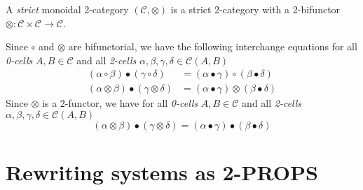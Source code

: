 \documentclass[a4paper]{article}
\begin{document}
\begin{definition}\label{def:monoidal-two-cat}
  A \emph{strict} monoidal 2-category $(\mathcal{C}, \otimes)$ is a strict
    2-category with a 2-bifunctor $\otimes: \mathcal{C} \times \mathcal{C} \to
    \mathcal{C}$.
\end{definition}


\begin{remark}
  Since $\circ$ and $\otimes$ are bifunctorial, we have the following
    interchange equations for all \emph{0-cells} $A, B \in \mathcal{C}$ and all
    \emph{2-cells} $\alpha, \beta, \gamma, \delta \in \mathcal{C}(A, B)$
  \begin{align}
    (\alpha \circ \beta) \bullet (\gamma \circ \delta) &= (\alpha \bullet
      \gamma) \circ (\beta \bullet \delta) \\
    (\alpha \otimes \beta) \bullet (\gamma \otimes \delta) &= (\alpha \bullet
      \gamma) \otimes (\beta \bullet \delta)
  \end{align}
  Since $\otimes$ is a 2-functor, we have for all \emph{0-cells} $A, B \in
    \mathcal{C}$ and all \emph{2-cells} $\alpha, \beta, \gamma, \delta \in
    \mathcal{C}(A, B)$
  \[
    (\alpha \otimes \beta) \bullet (\gamma \otimes \delta) = (\alpha \bullet
      \gamma) \bullet (\beta \bullet \delta)
  \]
\end{remark}

\section{Rewriting systems as 2-PROPS}
\label{sec:rewriting}
\end{document}
